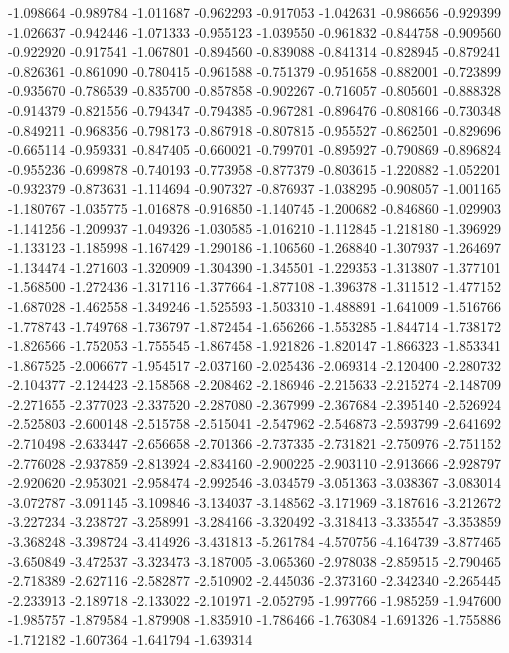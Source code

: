 -1.098664
-0.989784
-1.011687
-0.962293
-0.917053
-1.042631
-0.986656
-0.929399
-1.026637
-0.942446
-1.071333
-0.955123
-1.039550
-0.961832
-0.844758
-0.909560
-0.922920
-0.917541
-1.067801
-0.894560
-0.839088
-0.841314
-0.828945
-0.879241
-0.826361
-0.861090
-0.780415
-0.961588
-0.751379
-0.951658
-0.882001
-0.723899
-0.935670
-0.786539
-0.835700
-0.857858
-0.902267
-0.716057
-0.805601
-0.888328
-0.914379
-0.821556
-0.794347
-0.794385
-0.967281
-0.896476
-0.808166
-0.730348
-0.849211
-0.968356
-0.798173
-0.867918
-0.807815
-0.955527
-0.862501
-0.829696
-0.665114
-0.959331
-0.847405
-0.660021
-0.799701
-0.895927
-0.790869
-0.896824
-0.955236
-0.699878
-0.740193
-0.773958
-0.877379
-0.803615
-1.220882
-1.052201
-0.932379
-0.873631
-1.114694
-0.907327
-0.876937
-1.038295
-0.908057
-1.001165
-1.180767
-1.035775
-1.016878
-0.916850
-1.140745
-1.200682
-0.846860
-1.029903
-1.141256
-1.209937
-1.049326
-1.030585
-1.016210
-1.112845
-1.218180
-1.396929
-1.133123
-1.185998
-1.167429
-1.290186
-1.106560
-1.268840
-1.307937
-1.264697
-1.134474
-1.271603
-1.320909
-1.304390
-1.345501
-1.229353
-1.313807
-1.377101
-1.568500
-1.272436
-1.317116
-1.377664
-1.877108
-1.396378
-1.311512
-1.477152
-1.687028
-1.462558
-1.349246
-1.525593
-1.503310
-1.488891
-1.641009
-1.516766
-1.778743
-1.749768
-1.736797
-1.872454
-1.656266
-1.553285
-1.844714
-1.738172
-1.826566
-1.752053
-1.755545
-1.867458
-1.921826
-1.820147
-1.866323
-1.853341
-1.867525
-2.006677
-1.954517
-2.037160
-2.025436
-2.069314
-2.120400
-2.280732
-2.104377
-2.124423
-2.158568
-2.208462
-2.186946
-2.215633
-2.215274
-2.148709
-2.271655
-2.377023
-2.337520
-2.287080
-2.367999
-2.367684
-2.395140
-2.526924
-2.525803
-2.600148
-2.515758
-2.515041
-2.547962
-2.546873
-2.593799
-2.641692
-2.710498
-2.633447
-2.656658
-2.701366
-2.737335
-2.731821
-2.750976
-2.751152
-2.776028
-2.937859
-2.813924
-2.834160
-2.900225
-2.903110
-2.913666
-2.928797
-2.920620
-2.953021
-2.958474
-2.992546
-3.034579
-3.051363
-3.038367
-3.083014
-3.072787
-3.091145
-3.109846
-3.134037
-3.148562
-3.171969
-3.187616
-3.212672
-3.227234
-3.238727
-3.258991
-3.284166
-3.320492
-3.318413
-3.335547
-3.353859
-3.368248
-3.398724
-3.414926
-3.431813
-5.261784
-4.570756
-4.164739
-3.877465
-3.650849
-3.472537
-3.323473
-3.187005
-3.065360
-2.978038
-2.859515
-2.790465
-2.718389
-2.627116
-2.582877
-2.510902
-2.445036
-2.373160
-2.342340
-2.265445
-2.233913
-2.189718
-2.133022
-2.101971
-2.052795
-1.997766
-1.985259
-1.947600
-1.985757
-1.879584
-1.879908
-1.835910
-1.786466
-1.763084
-1.691326
-1.755886
-1.712182
-1.607364
-1.641794
-1.639314
